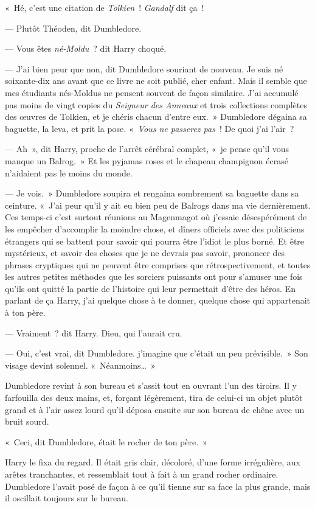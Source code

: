 «~Hé, c'est une citation de \emph{Tolkien}~! \emph{Gandalf} dit ça~!

--- Plutôt Théoden, dit Dumbledore.

--- Vous êtes \emph{né-Moldu}~? dit Harry choqué.

--- J'ai bien peur que non, dit Dumbledore souriant de nouveau. Je suis né soixante-dix ans avant que ce livre ne soit publié, cher enfant. Mais il semble que mes étudiants nés-Moldus ne pensent souvent de façon similaire. J'ai accumulé pas moins de vingt copies du \emph{Seigneur des Anneaux} et trois collections complètes des œuvres de Tolkien, et je chéris chacun d'entre eux.~» Dumbledore dégaina sa baguette, la leva, et prit la pose. «~\emph{Vous ne passerez pas}~! De quoi j'ai l'air~?

--- Ah~», dit Harry, proche de l'arrêt cérébral complet, «~je pense qu'il vous manque un Balrog.~» Et les pyjamas roses et le chapeau champignon écrasé n'aidaient pas le moins du monde.

--- Je vois.~» Dumbledore soupira et rengaina sombrement sa baguette dans sa ceinture. «~J'ai peur qu'il y ait eu bien peu de Balrogs dans ma vie dernièrement. Ces temps-ci c'est surtout réunions au Magenmagot où j'essaie désespérément de les empêcher d'accomplir la moindre chose, et dîners officiels avec des politiciens étrangers qui se battent pour savoir qui pourra être l'idiot le plus borné. Et être mystérieux, et savoir des choses que je ne devrais pas savoir, prononcer des phrases cryptiques qui ne peuvent être comprises que rétrospectivement, et toutes les autres petites méthodes que les sorciers puissants ont pour s'amuser une fois qu'ils ont quitté la partie de l'histoire qui leur permettait d'être des héros. En parlant de ça Harry, j'ai quelque chose à te donner, quelque chose qui appartenait à ton père.

--- Vraiment~? dit Harry. Dieu, qui l'aurait cru.

--- Oui, c'est vrai, dit Dumbledore. j'imagine que c'était un peu prévisible.~» Son visage devint solennel. «~Néanmoins…~»

Dumbledore revint à son bureau et s'assit tout en ouvrant l'un des tiroirs. Il y farfouilla des deux mains, et, forçant légèrement, tira de celui-ci un objet plutôt grand et à l'air assez lourd qu'il déposa ensuite sur son bureau de chêne avec un bruit sourd.

«~Ceci, dit Dumbledore, était le rocher de ton père.~»

Harry le fixa du regard. Il était gris clair, décoloré, d'une forme irrégulière, aux arêtes tranchantes, et ressemblait tout à fait à un grand rocher ordinaire. Dumbledore l'avait posé de façon à ce qu'il tienne sur sa face la plus grande, mais il oscillait toujours sur le bureau.

